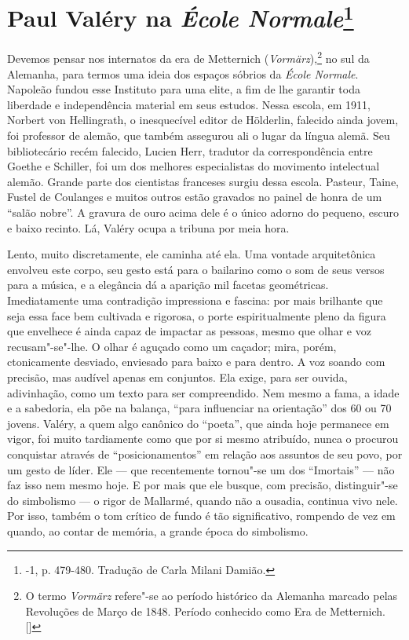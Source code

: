 \chapter{Paul Valéry na \emph{École Normale}\footnote[*]{-1, p. 479-480. Tradução de Carla Milani Damião.}}

Devemos pensar nos internatos da era de Metternich
(\emph{Vormärz}),\footnote{O termo \emph{Vormärz} refere"-se ao período
  histórico da Alemanha marcado pelas Revoluções de Março de 1848.
  Período conhecido como Era de Metternich. []} no sul da
Alemanha, para termos uma ideia dos espaços sóbrios da \emph{École
Normale}. Napoleão fundou esse Instituto para uma elite, a fim de lhe
garantir toda liberdade e independência material em seus estudos. Nessa
escola, em 1911, Norbert von Hellingrath, o inesquecível editor de
Hölderlin, falecido ainda jovem, foi professor de alemão, que também
assegurou ali o lugar da língua alemã. Seu bibliotecário recém falecido,
Lucien Herr, tradutor da correspondência entre Goethe e Schiller, foi um
dos melhores especialistas do movimento intelectual alemão. Grande parte
dos cientistas franceses surgiu dessa escola. Pasteur, Taine, Fustel de
Coulanges e muitos outros estão gravados no painel de honra de um
``salão nobre''. A gravura de ouro acima dele é o único adorno do
pequeno, escuro e baixo recinto. Lá, Valéry ocupa a tribuna por meia
hora.

Lento, muito discretamente, ele caminha até ela. Uma vontade
arquitetônica envolveu este corpo, seu gesto está para o bailarino como
o som de seus versos para a música, e a elegância dá a aparição mil
facetas geométricas. Imediatamente uma contradição impressiona e
fascina: por mais brilhante que seja essa face bem cultivada e rigorosa,
o porte espiritualmente pleno da figura que envelhece é ainda capaz de
impactar as pessoas, mesmo que olhar e voz recusam"-se"-lhe. O olhar é
aguçado como um caçador; mira, porém, ctonicamente desviado, enviesado
para baixo e para dentro. A voz soando com precisão, mas audível apenas
em conjuntos. Ela exige, para ser ouvida, adivinhação, como um texto
para ser compreendido. Nem mesmo a fama, a idade e a sabedoria, ela põe
na balança, ``para influenciar na orientação'' dos 60 ou 70 jovens.
Valéry, a quem algo canônico do ``poeta'', que ainda hoje permanece em
vigor, foi muito tardiamente como que por si mesmo atribuído, nunca o
procurou conquistar através de ``posicionamentos'' em relação aos
assuntos de seu povo, por um gesto de líder. Ele --- que recentemente
tornou"-se um dos ``Imortais'' --- não faz isso nem mesmo hoje. E por mais
que ele busque, com precisão, distinguir"-se do simbolismo --- o rigor de
Mallarmé, quando não a ousadia, continua vivo nele. Por isso, também o
tom crítico de fundo é tão significativo, rompendo de vez em quando, ao
contar de memória, a grande época do simbolismo.

